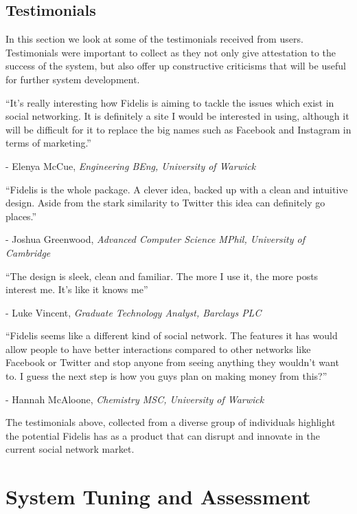 \subsection{Testimonials}
In this section we look at some of the testimonials received from users. Testimonials were important to collect as they not only give attestation to the success of the system, but also offer up constructive criticisms that will be useful for further system development.

\begin{displayquote}
	\enquote{It's really interesting how Fidelis is aiming to tackle the issues which exist in social networking. It is definitely a site I would be interested in using, although it will be difficult for it to replace the big names such as Facebook and Instagram in terms of marketing.}
	
	- Elenya McCue, \textit{Engineering BEng, University of Warwick}
\end{displayquote}

\begin{displayquote}
	\enquote{Fidelis is the whole package. A clever idea, backed up with a clean and intuitive design. Aside from the stark similarity to Twitter this idea can definitely go places.}
	
	- Joshua Greenwood, \textit{Advanced Computer Science MPhil, University of Cambridge}
\end{displayquote}

\begin{displayquote}
	\enquote{The design is sleek, clean and familiar. The more I use it, the more posts interest me. It's like it knows me} 
	
	- Luke Vincent, \textit{Graduate Technology Analyst, Barclays PLC}
\end{displayquote}

\begin{displayquote}
	\enquote{Fidelis seems like a different kind of social network. The features it has would allow people to have better interactions compared to other networks like Facebook or Twitter and stop anyone from seeing anything they wouldn't want to. I guess the next step is how you guys plan on making money from this?}
	
	- Hannah McAloone, \textit{Chemistry MSC, University of Warwick}
\end{displayquote}

\noindent The testimonials above, collected from a diverse group of individuals highlight the potential Fidelis has as a product that can disrupt and innovate in the current social network market. 

\section{System Tuning and Assessment}